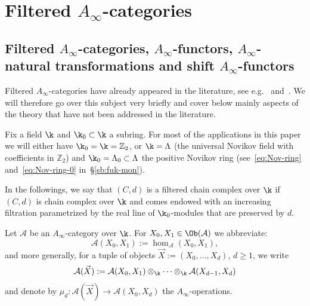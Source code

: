 
\appendix

\section{Filtered $A_{\infty}$-categories} \label{a:fil-ai}
\subsection{Filtered $A_\infty$-categories, $A_\infty$-functors, $A_\infty$-natural transformations and shift $A_\infty$-functors}\label{a:sb:fil-ai}
 Filtered
$A_{\infty}$-categories have already appeared in the literature, see
e.g.~\cite[Section~3.2]{BCZ:tpc}
and~\cite[Chapter~2]{Bi-Co-Sh:LagrSh}. We will therefore go over this
subject very briefly and cover below mainly aspects of the theory that
have not been addressed in the literature.

Fix a field $\k$ and $\k_0 \subset \k$ a subring. For most of the
applications in this paper we will either have
$\k_0 = \k = \mathbb{Z}_2$, or $\k = \Lambda$ (the universal Novikov
field with coefficients in $\mathbb{Z}_2$) and
$\k_0 = \Lambda_0 \subset \Lambda$ the positive Novikov ring
(see~\eqref{eq:Nov-ring} and~\eqref{eq:Nov-ring-0}
in~\S\ref{sb:fuk-mon}).

In the followings, we say that $(C,d)$ is a filtered chain complex over $\k$ if $(C,d)$ is chain complex over $\k$ and comes endowed with an increasing filtration parametrized by the real line of $\k_0$-modules that are preserved by $d$.

Let $\mathcal{A}$ be an $A_{\infty}$-category over $\k$. For
$X_0, X_1 \in \Ob(\mathcal{A})$ we abbreviate:
$$\mathcal{A}(X_0,X_1):= \hom_{\mathcal{A}}(X_0,X_1),$$ and
more generally, for a tuple of objects
$\vec{X} := (X_0, \ldots, X_d)$, $d \geq 1$, we write
$$\mathcal{A}(\vec{X}) := \mathcal{A}(X_0, X_1) \otimes_{\k} \cdots
\otimes_{\k} \mathcal{A}(X_{d-1}, X_d)$$ and denote by
$\mu_d: \mathcal{A}(\vec{X}) \longrightarrow \mathcal{A}(X_0, X_d)$
the $A_{\infty}$-operations.


